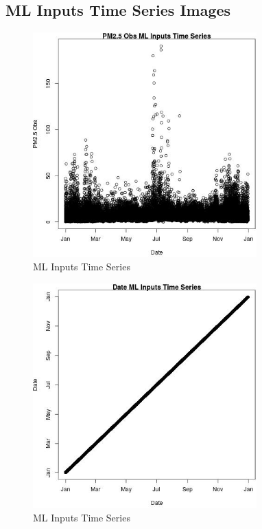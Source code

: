 
\subsection{ML Inputs Time Series Images} 
 

\begin{figure} 
\centering  
\includegraphics[width=0.77\textwidth]{Code_Outputs/Report_ML_input_PM25_Step4_part_e_de_duplicated_aves_PM25_ObsvDate.jpg} 
\caption{\label{fig:Report_ML_input_PM25_Step4_part_e_de_duplicated_avesPM25_ObsvDate}ML Inputs Time Series} 
\end{figure} 
 

\begin{figure} 
\centering  
\includegraphics[width=0.77\textwidth]{Code_Outputs/Report_ML_input_PM25_Step4_part_e_de_duplicated_aves_DatevDate.jpg} 
\caption{\label{fig:Report_ML_input_PM25_Step4_part_e_de_duplicated_avesDatevDate}ML Inputs Time Series} 
\end{figure} 
 

